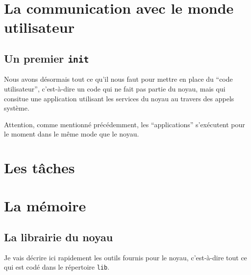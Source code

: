 \documentclass{book}
\begin{document}
\chapter{La communication avec le monde utilisateur}


%
\section{Un premier {\tt init}}

   Nous avons désormais tout ce qu'il nous faut pour mettre en place
du ``code utilisateur'', c'est-à-dire un code qui ne fait pas partie
du noyau, mais qui consitue une application utilisant les services du
noyau au travers des appels système.

   Attention, comme mentionné précédemment, les ``applications''
s'exécutent pour le moment dans le même mode que le noyau.

\chapter{Les tâches}


\chapter{La mémoire}


%
\section{La librairie du noyau}

   Je vais décrire ici rapidement les outils fournis pour le noyau,
c'est-à-dire tout ce qui est codé dans le répertoire {\tt lib}.

%
\end{document}
